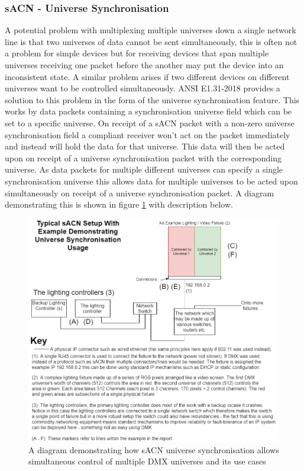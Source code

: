 \documentclass[11pt,a4paper]{article}
\begin{document}
\subsubsection{sACN - Universe Synchronisation}
A potential problem with multiplexing multiple universes down a single network line is that two universes of data cannot be sent simultaneously, this is often not a problem for simple devices but for receiving devices that span multiple universes receiving one packet before the another may put the device into an inconsistent state. A similar problem arises if two different devices on different universes want to be controlled simultaneously. ANSI E1.31-2018 provides a solution to this problem in the form of the universe synchronisation feature. This works by data packets containing a synchronisation universe field which can be set to a specific universe. On receipt of a sACN packet with a non-zero universe synchronisation field a compliant receiver won't act on the packet immediately and instead will hold the data for that universe. This data will then be acted upon on receipt of a universe synchronisation packet with the corresponding universe. As data packets for multiple different universes can specify a single synchronisation universe this allows data for multiple universes to be acted upon simultaneously on receipt of a universe synchronisation packet. A diagram demonstrating this is shown in figure \ref{UNI_SYNC_DESC} with description below.

\begin{figure}[H]
	\label{UNI_SYNC_DESC}
	\includegraphics[width=\textwidth]{sacn-uni-sync-example}
	\caption{A diagram demonstrating how sACN universe synchronisation allows simultaneous control of multiple DMX universes and its use cases}
\end{figure}
\end{document}
